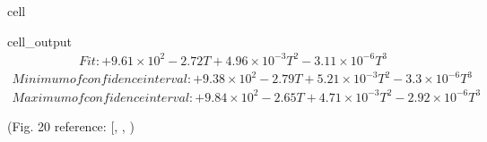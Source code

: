\documentclass[letterpaper,10pt,english]{jupyterBook}
\begin{document}
\begin{sphinxuseclass}{cell}
\begin{sphinxVerbatimOutput}
\begin{sphinxuseclass}{cell_output}
				\sphinxAtStartPar
				\begin{equation*}
					\begin{split}Fit: \boxed{ + 9.61 \times 10^{2} - 2.72 T + 4.96 \times 10^{-3} T^{2} - 3.11 \times 10^{-6} T^{3}  }\end{split}
				\end{equation*}\begin{equation*}
					\begin{split}Minimum of confidence interval: \boxed{ + 9.38 \times 10^{2} - 2.79 T + 5.21 \times 10^{-3} T^{2} - 3.3 \times 10^{-6} T^{3}  }\end{split}
				\end{equation*}\begin{equation*}
					\begin{split}Maximum of confidence interval: \boxed{ + 9.84 \times 10^{2} - 2.65 T + 4.71 \times 10^{-3} T^{2} - 2.92 \times 10^{-6} T^{3}  }\end{split}
				\end{equation*}
				\noindent{}
				
		\end{sphinxuseclass}\end{sphinxVerbatimOutput}
		
	\end{sphinxuseclass}
	\sphinxAtStartPar
	(Fig. 20 reference: {[}, , \sphinxhref{https://drive.google.com/file/d/1CS0SmOoC0Ukjj6AhscMyon7bKQiny88N/view?usp=drive\_link}{Klueh1997}{]})
	
	
\end{document}
